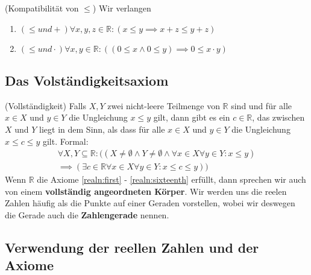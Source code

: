 \documentclass[../Analysis1_script.tex]{subfiles}
\begin{document}
\begin{axiom}{(Kompatibilität von $\leq$)}
	Wir verlangen
	\begin{enumerate}[resume]
	\item \label{kom:first}$(\leq und +)\forall x, y, z \in \mathbb{R}: (x \leq y \implies x + z \leq y + z)$
	\item \label{kom:second}$(\leq und \cdot)\forall x, y \in \mathbb{R}: ((0 \leq x \wedge 0 \leq y) \implies 0 \leq x \cdot y)$
	\end{enumerate}
\end{axiom}

\subsection{Das Volständigkeitsaxiom}
\begin{axiom}{(Vollständigkeit)} \label{realn:sixteenth}
	Falls $X, Y$ zwei nicht-leere Teilmenge von $\mathbb{R}$ sind und für alle $x \in X$ und $y \in Y$ die Ungleichung $x \leq y$ gilt, dann gibt es ein $c \in \mathbb{R}$, das zwischen $X$ und $Y$ liegt in dem Sinn, als dass für alle $x \in X$ und $y \in Y$ die Ungleichung $x \leq c \leq y$ gilt. Formal:
	\begin{equation}
	\begin{split}
		\forall X, Y \subseteq \mathbb{R}: ((X \neq \emptyset \wedge Y \neq \emptyset \wedge \forall x \in X \forall y \in Y : x \leq y)\\
		 \implies (\exists c \in \mathbb{R} \forall x \in X \forall y \in Y : x \leq c \leq y))
	\end{split} 
	\end{equation}
	Wenn $\mathbb{R}$ die Axiome \ref{realn:first} - \ref{realn:sixteenth} erfüllt, dann sprechen wir auch von einem \textbf{vollständig angeordneten Körper}. Wir werden uns die reelen Zahlen häufig als die Punkte auf einer Geraden vorstellen, wobei wir deswegen die Gerade auch die \textbf{Zahlengerade} nennen.
\end{axiom}

\subsection{Verwendung der reellen Zahlen und der Axiome}
\end{document}
